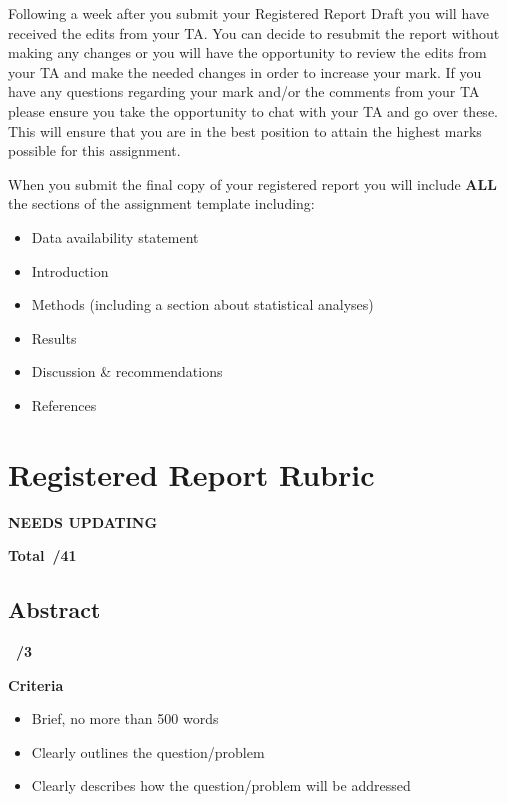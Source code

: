 \documentclass[
]{book}
\providecommand{\tightlist}{%
  \setlength{\itemsep}{0pt}\setlength{\parskip}{0pt}}
\begin{document}
Following a week after you submit your Registered Report Draft you will have received the edits from your TA. You can decide to resubmit the report without making any changes or you will have the opportunity to review the edits from your TA and make the needed changes in order to increase your mark. If you have any questions regarding your mark and/or the comments from your TA please ensure you take the opportunity to chat with your TA and go over these. This will ensure that you are in the best position to attain the highest marks possible for this assignment.

When you submit the final copy of your registered report you will include \textbf{ALL} the sections of the assignment template including:

\begin{itemize}
\tightlist
\item
  Data availability statement
\item
  Introduction
\item
  Methods (including a section about statistical analyses)
\item
  Results
\item
  Discussion \& recommendations
\item
  References
\end{itemize}

\hypertarget{registered-report-rubric}{%
\section*{Registered Report Rubric}\label{registered-report-rubric}}

\textbf{NEEDS UPDATING}

\textbf{Total~/41}

\hypertarget{abstract}{%
\subsection*{Abstract}\label{abstract}}

\textbf{~/3}

\textbf{Criteria}

\begin{itemize}
\tightlist
\item
  Brief, no more than 500 words
\item
  Clearly outlines the question/problem
\item
  Clearly describes how the question/problem will be addressed
\end{itemize}
\end{document}
